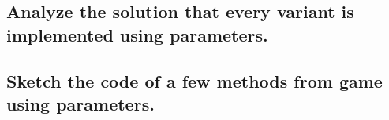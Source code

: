 \subsection*{ Analyze the solution that every variant is implemented using
    parameters. }

\subsection*{ Sketch the code of a few methods from game using parameters. }

